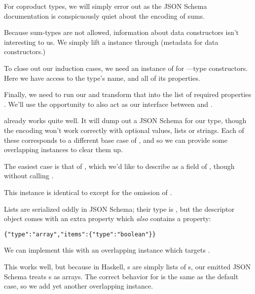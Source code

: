 \documentclass[book.tex]{subfiles}
\begin{document}

For coproduct types, we will simply error out as the JSON Schema documentation
is conspicuously quiet about the encoding of sums.


Because sum-types are not allowed, information about data constructors isn't
interesting to us. We simply lift a  instance through 
(metadata for data constructors.)


To close out our induction cases, we need an instance of  for ---type constructors. Here we have access to the type's name, and all of its
properties.


Finally, we need to run our  and transform that into the list
of required properties . We'll use the opportunity to also act
as our interface between  and .


 already works quite well. It will dump out a JSON Schema for our
 type, though the encoding won't work correctly with optional values,
lists or strings. Each of these corresponds to a different base case of , and so we can provide some overlapping instances to clear them up.

The easiest case is that of , which we'd like to describe as a field
of , though without calling .


This instance is identical to  except for the omission of
.

Lists are serialized oddly in JSON Schema; their type is , but the
descriptor object comes with an extra property  which \emph{also}
contains a  property:

\begin{alltt}
\{ "type": "array", "items": \{ "type": "boolean" \}\}
\end{alltt}

We can implement this with an overlapping instance which targets .


This works well, but because in Haskell, s are simply lists of
s, our emitted JSON Schema treats s as arrays. The correct
behavior for  is the same as the default  case, so we add
yet another overlapping instance.
\end{document}
